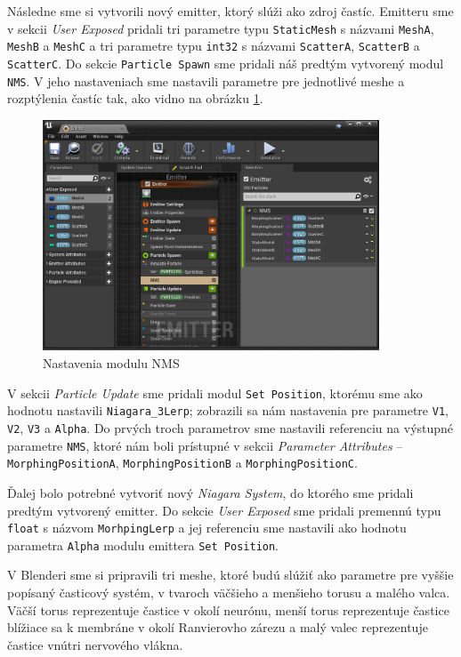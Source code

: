 Následne sme si vytvorili nový emitter, ktorý slúži ako zdroj častíc. Emitteru sme v sekcii \emph{User Exposed} pridali tri parametre typu \texttt{StaticMesh} s názvami \texttt{MeshA}, \texttt{MeshB} a \texttt{MeshC}
a tri parametre typu \texttt{int32} s názvami \texttt{ScatterA}, \texttt{ScatterB} a \texttt{ScatterC}. Do sekcie \texttt{Particle Spawn} sme pridali náš predtým vytvorený modul \texttt{NMS}. V jeho nastaveniach sme 
nastavili parametre pre jednotlivé meshe a rozptýlenia častíc tak, ako vidno na obrázku \ref{nms-settings}. 

\begin{figure}[!htbp]
  \centering
  \includegraphics[width=10cm]{img/nms-settings.png}
  \caption{Nastavenia modulu NMS}
  \label{nms-settings}
\end{figure}	

V sekcii \emph{Particle Update} sme pridali modul \texttt{Set Position}, ktorému sme ako hodnotu nastavili 
\texttt{Niagara\_3Lerp}; zobrazili sa nám nastavenia pre parametre \texttt{V1}, \texttt{V2}, \texttt{V3} a \texttt{Alpha}. Do prvých troch parametrov sme nastavili referenciu na výstupné parametre \texttt{NMS}, ktoré
nám boli prístupné v sekcii \emph{Parameter Attributes} {--} \texttt{MorphingPositionA}, \texttt{MorphingPositionB} a \texttt{MorphingPositionC}. 

Ďalej bolo potrebné vytvoriť nový \emph{Niagara System}, do ktorého sme pridali predtým vytvorený emitter. Do sekcie \emph{User Exposed} sme pridali premennú typu \texttt{float} s názvom \texttt{MorhpingLerp} a jej 
referenciu sme nastavili ako hodnotu parametra \texttt{Alpha} modulu emittera \texttt{Set Position}.

V Blenderi sme si pripravili tri meshe, ktoré budú slúžiť ako parametre pre vyššie popísaný časticový systém, v tvaroch väčšieho a menšieho torusu a malého valca. Väčší torus reprezentuje častice v okolí neurónu, 
menší torus reprezentuje častice blížiace sa k membráne v okolí Ranvierovho zárezu a malý valec reprezentuje častice vnútri nervového vlákna.

